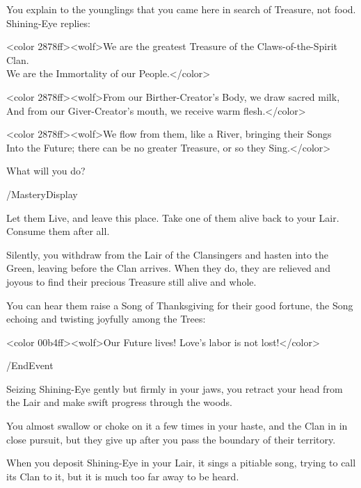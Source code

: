 You explain to the younglings that you came here in search of Treasure, not
food. Shining-Eye replies:

<color 2878ff><wolf>We are the greatest Treasure of the Claws-of-the-Spirit
Clan.\\ We are the Immortality of our People.</color>

<color 2878ff><wolf>From our Birther-Creator's Body, we draw sacred milk,\\
And from our Giver-Creator's mouth, we receive warm flesh.</color>

<color 2878ff><wolf>We flow from them, like a River, bringing their Songs\\
Into the Future; there can be no greater Treasure, or so they Sing.</color>

What will you do?

/MasteryDisplay

\option Let them Live, and leave this place. 
\option Take one of them alive back to your Lair. 
\option Consume them after all.
	  


Silently, you withdraw from the Lair of the Clansingers and hasten into the
Green, leaving before the Clan arrives. When they do, they are relieved and
joyous to find their precious Treasure still alive and whole.

You can hear them raise a Song of Thanksgiving for their good fortune, the Song
echoing and twisting joyfully among the Trees:

<color 00b4ff><wolf>Our Future lives! Love's labor is not lost!</color>

\option /EndEvent   
   


Seizing Shining-Eye gently but firmly in your jaws, you retract your head from
the Lair and make swift progress through the woods.

You almost swallow or choke on it a few times in your haste, and the Clan in in
close pursuit, but they give up after you pass the boundary of their territory.

When you deposit Shining-Eye in your Lair, it sings a pitiable song, trying to
call its Clan to it, but it is much too far away to be heard.


